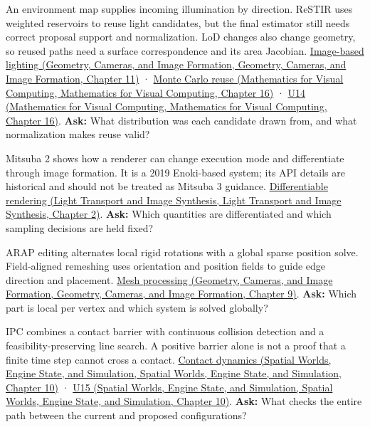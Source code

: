 An environment map supplies incoming illumination by direction. ReSTIR uses weighted reservoirs to reuse light candidates, but the final estimator still needs correct proposal support and normalization. LoD changes also change geometry, so reused paths need a surface correspondence and its area Jacobian. \href{../03-Geometry-Cameras-and-Image-Formation/main.pdf\#nameddest=03-visual-computing-i-ch004-light-measurement-and-radiometry}{Image-based lighting (Geometry, Cameras, and Image Formation, Geometry, Cameras, and Image Formation, Chapter 11)} · \href{../02-Mathematics-for-Visual-Computing/main.pdf\#nameddest=03-visual-computing-i-ch012-numerical-integration-and-monte-carlo-estimation}{Monte Carlo reuse (Mathematics for Visual Computing, Mathematics for Visual Computing, Chapter 16)} · \href{../02-Mathematics-for-Visual-Computing/main.pdf\#nameddest=03-visual-computing-i-ch012-figure-u14---a-reservoir-selects-a-candidate-by-its-weight}{U14 (Mathematics for Visual Computing, Mathematics for Visual Computing, Chapter 16)}. \textbf{Ask:} What distribution was each candidate drawn from, and what normalization makes reuse valid?

Mitsuba 2 shows how a renderer can change execution mode and differentiate through image formation. It is a 2019 Enoki-based system; its API details are historical and should not be treated as Mitsuba 3 guidance. \href{../04-Light-Transport-and-Image-Synthesis/main.pdf\#nameddest=03-visual-computing-i-ch007-the-rendering-equation-and-light-transport}{Differentiable rendering (Light Transport and Image Synthesis, Light Transport and Image Synthesis, Chapter 2)}. \textbf{Ask:} Which quantities are differentiated and which sampling decisions are held fixed?

ARAP editing alternates local rigid rotations with a global sparse position solve. Field-aligned remeshing uses orientation and position fields to guide edge direction and placement. \href{../03-Geometry-Cameras-and-Image-Formation/main.pdf\#nameddest=03-visual-computing-i-ch002-meshes-connectivity-and-geometry-processing}{Mesh processing (Geometry, Cameras, and Image Formation, Geometry, Cameras, and Image Formation, Chapter 9)}. \textbf{Ask:} Which part is local per vertex and which system is solved globally?

IPC combines a contact barrier with continuous collision detection and a feasibility-preserving line search. A positive barrier alone is not a proof that a finite time step cannot cross a contact. \href{../05-Spatial-Worlds-Engine-State-and-Simulation/main.pdf\#nameddest=04-visual-computing-ii-ch029-dynamics-forces-and-numerical-integration}{Contact dynamics (Spatial Worlds, Engine State, and Simulation, Spatial Worlds, Engine State, and Simulation, Chapter 10)} · \href{../05-Spatial-Worlds-Engine-State-and-Simulation/main.pdf\#nameddest=04-visual-computing-ii-ch029-figure-u15---the-contact-barrier-grows-near-zero-separation}{U15 (Spatial Worlds, Engine State, and Simulation, Spatial Worlds, Engine State, and Simulation, Chapter 10)}. \textbf{Ask:} What checks the entire path between the current and proposed configurations?

